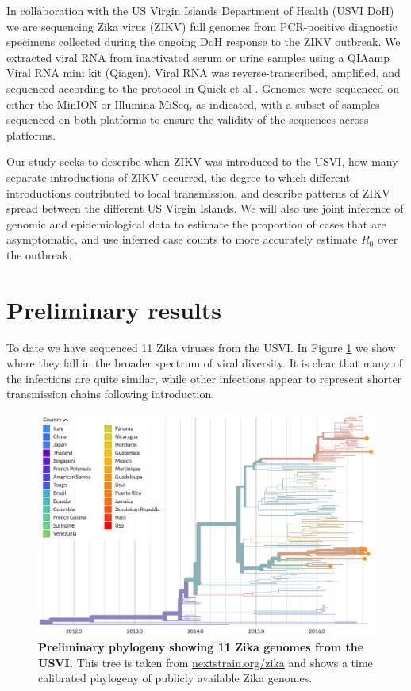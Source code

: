 \documentclass[11pt,oneside,letterpaper]{article}
\begin{document}
In collaboration with the US Virgin Islands Department of Health (USVI DoH) we are sequencing Zika virus (ZIKV) full genomes from PCR-positive diagnostic specimens collected during the ongoing DoH response to the ZIKV outbreak.
We extracted viral RNA from inactivated serum or urine samples using a QIAamp Viral RNA mini kit (Qiagen).
Viral RNA was reverse-transcribed, amplified, and sequenced according to the protocol in Quick et al \cite{quick2017multiplex}.
Genomes were sequenced on either the MinION or Illumina MiSeq, as indicated, with a subset of samples sequenced on both platforms to ensure the validity of the sequences across platforms.

Our study seeks to describe when ZIKV was introduced to the USVI, how many separate introductions of ZIKV occurred, the degree to which different introductions contributed to local transmission, and describe patterns of ZIKV spread between the different US Virgin Islands.
We will also use joint inference of genomic and epidemiological data to estimate the proportion of cases that are asymptomatic, and use inferred case counts to more accurately estimate $R_0$ over the outbreak.

\section*{Preliminary results}

To date we have sequenced 11 Zika viruses from the USVI. In Figure \ref{zika_usvi_tree} we show where they fall in the broader spectrum of viral diversity.
It is clear that many of the infections are quite similar, while other infections appear to represent shorter transmission chains following introduction.

\begin{figure}[h]
	\centering
	\includegraphics[width=1.0\textwidth]{figures/zika_usvi_tree}
	\caption{\textbf{Preliminary phylogeny showing 11 Zika genomes from the USVI.}
	This tree is taken from \href{https://nextstrain.org/zika}{nextstrain.org/zika} and shows a time calibrated phylogeny of publicly available Zika genomes.
	}
	\label{zika_usvi_tree}
\end{figure}



\end{document}
